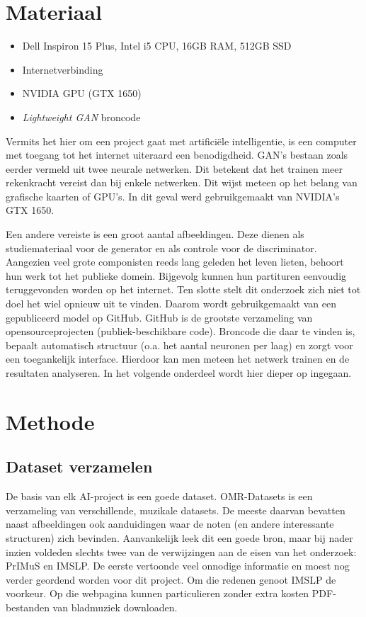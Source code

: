 \documentclass[dutch, twoside, a4paper, 10pt]{article}
\begin{document}
\section{Materiaal}

\begin{itemize}
\setlength{\itemsep}{1pt}
\item Dell Inspiron 15 Plus, Intel i5 CPU, 16GB RAM, 512GB SSD
\item Internetverbinding
\item NVIDIA GPU (GTX 1650)
\item \textit{Lightweight GAN} broncode
\end{itemize}
Vermits het hier om een project gaat met artificiële intelligentie, is een computer met toegang tot het internet uiteraard een benodigdheid. GAN's bestaan zoals eerder vermeld uit twee neurale netwerken. Dit betekent dat het trainen meer rekenkracht vereist dan bij enkele netwerken. Dit wijst meteen op het belang van grafische kaarten of GPU's. In dit geval werd gebruikgemaakt van NVIDIA's GTX 1650. \par\bigskip\noindent
Een andere vereiste is een groot aantal afbeeldingen. Deze dienen als studiemateriaal voor de generator en als controle voor de discriminator. Aangezien veel grote componisten reeds lang geleden het leven lieten, behoort hun werk tot het publieke domein. Bijgevolg kunnen hun partituren eenvoudig teruggevonden worden op het internet. Ten slotte stelt dit onderzoek zich niet tot doel het wiel opnieuw uit te vinden. Daarom wordt gebruikgemaakt van een gepubliceerd model op GitHub. GitHub is de grootste verzameling van opensourceprojecten (publiek-beschikbare code).  Broncode die daar te vinden is, bepaalt automatisch structuur (o.a. het aantal neuronen per laag) en zorgt voor een toegankelijk interface. Hierdoor kan men meteen het netwerk trainen en de resultaten analyseren. In het volgende onderdeel wordt hier dieper op ingegaan.

\section{Methode}
\subsection{Dataset verzamelen}
De basis van elk AI-project is een goede dataset. OMR-Datasets is een verzameling van verschillende, muzikale datasets. De meeste daarvan bevatten naast afbeeldingen ook aanduidingen waar de noten (en andere interessante structuren) zich bevinden. Aanvankelijk leek dit een goede bron, maar bij nader inzien voldeden slechts twee van de verwijzingen aan de eisen van het onderzoek: PrIMuS en IMSLP. De eerste vertoonde veel onnodige informatie en moest nog verder geordend worden voor dit project. Om die redenen genoot IMSLP de voorkeur. Op die webpagina kunnen particulieren zonder extra kosten PDF-bestanden van bladmuziek downloaden. 
\end{document}
